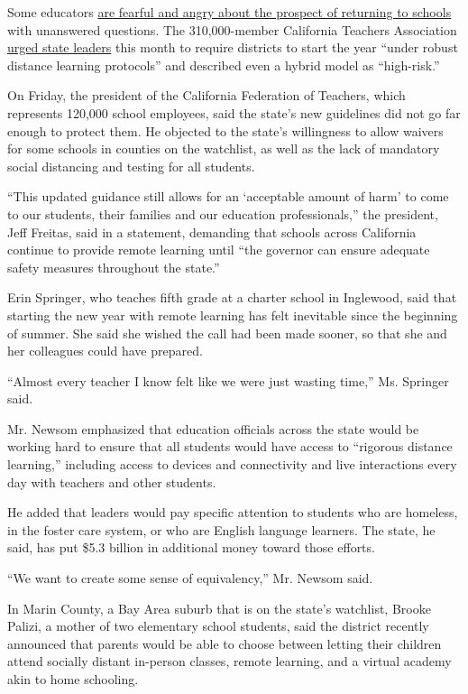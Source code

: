 Some educators
\href{https://www.nytimes.com/2020/07/11/us/virus-teachers-classrooms.html}{are
fearful and angry about the prospect of returning to schools} with
unanswered questions. The 310,000-member California Teachers Association
\href{https://aarjb2jw4n53e35fhbquj418-wpengine.netdna-ssl.com/wp-content/uploads/2020/07/CTA-Elected-Leaders-COVID-Letter-7.8.20.pdf}{urged
state leaders} this month to require districts to start the year ``under
robust distance learning protocols'' and described even a hybrid model
as ``high-risk.''

On Friday, the president of the California Federation of Teachers, which
represents 120,000 school employees, said the state's new guidelines did
not go far enough to protect them. He objected to the state's
willingness to allow waivers for some schools in counties on the
watchlist, as well as the lack of mandatory social distancing and
testing for all students.

``This updated guidance still allows for an `acceptable amount of harm'
to come to our students, their families and our education
professionals,'' the president, Jeff Freitas, said in a statement,
demanding that schools across California continue to provide remote
learning until ``the governor can ensure adequate safety measures
throughout the state.''

Erin Springer, who teaches fifth grade at a charter school in Inglewood,
said that starting the new year with remote learning has felt inevitable
since the beginning of summer. She said she wished the call had been
made sooner, so that she and her colleagues could have prepared.

``Almost every teacher I know felt like we were just wasting time,'' Ms.
Springer said.

Mr. Newsom emphasized that education officials across the state would be
working hard to ensure that all students would have access to ``rigorous
distance learning,'' including access to devices and connectivity and
live interactions every day with teachers and other students.

He added that leaders would pay specific attention to students who are
homeless, in the foster care system, or who are English language
learners. The state, he said, has put \$5.3 billion in additional money
toward those efforts.

``We want to create some sense of equivalency,'' Mr. Newsom said.

In Marin County, a Bay Area suburb that is on the state's watchlist,
Brooke Palizi, a mother of two elementary school students, said the
district recently announced that parents would be able to choose between
letting their children attend socially distant in-person classes, remote
learning, and a virtual academy akin to home schooling.

